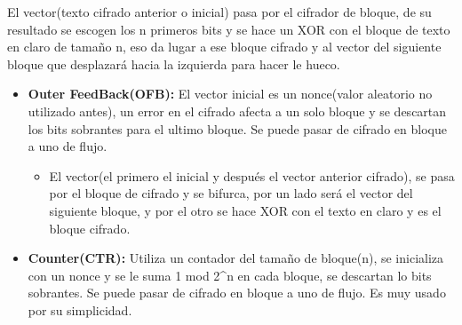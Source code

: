 \documentclass[12pt, twoside, openright]{report} %
\begin{document}
  El vector(texto cifrado anterior o inicial) pasa por el cifrador de
  bloque, de su resultado se escogen los n primeros bits y se hace un
  XOR con el bloque de texto en claro de tamaño n, eso da lugar a ese
  bloque cifrado y al vector del siguiente bloque que desplazará hacia
  la izquierda para hacer le hueco.

  \begin{itemize}
  \item \textbf{Outer FeedBack(OFB):} El vector inicial es un nonce(valor
    aleatorio no utilizado antes), un error en el cifrado afecta a un
    solo bloque y se descartan los bits sobrantes para el ultimo bloque.
    Se puede pasar de cifrado en bloque a uno de flujo.
    

    \begin{itemize}
    \item El vector(el primero el inicial y después el vector anterior
      cifrado), se pasa por el bloque de cifrado y se bifurca, por un
      lado será el vector del siguiente bloque, y por el otro se hace
      XOR con el texto en claro y es el bloque cifrado.
      
    \end{itemize}
  \item \textbf{Counter(CTR):} Utiliza un contador del tamaño de bloque(n),
    se inicializa con un nonce y se le suma 1 mod 2\^{}n en cada bloque,
    se descartan lo bits sobrantes. Se puede pasar de cifrado en bloque
    a uno de flujo. Es muy usado por su simplicidad.
    
  \end{itemize}
\end{document}
